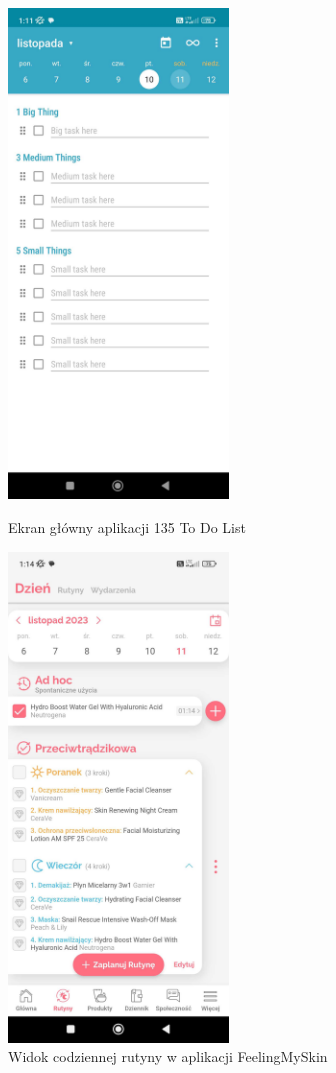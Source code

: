 \begin{figure}[ht]
  \begin{minipage}{0.4\textwidth}
    \centering
    \includegraphics[height=13cm, keepaspectratio]{images/analiza/135ToDoList}
    \caption{Ekran główny aplikacji 135 To Do List}
    \label{fig:ToDoList}
  \end{minipage}
  \hfill
  \begin{minipage}{0.4\textwidth}
    \centering
    \includegraphics[height=13cm, keepaspectratio]{images/analiza/feelingMySkin}
    \caption{Widok codziennej rutyny w aplikacji FeelingMySkin}
    \label{fig:feelingMySkin}
  \end{minipage}
\end{figure}

